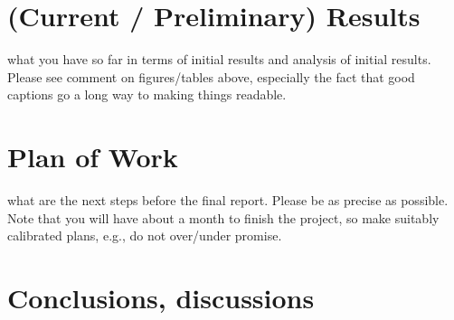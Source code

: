 \documentclass[11pt]{extarticle}
\begin{document}
\section{(Current / Preliminary) Results} 
what you have so far in terms of initial results and analysis of initial results. Please see comment on figures/tables above, especially the fact that good captions go a long way to making things readable.

\section{Plan of Work} 
what are the next steps before the final report. Please be as precise as possible. Note that you will have about a month to finish the project, so make suitably calibrated plans, e.g., do not over/under promise.

\section{Conclusions, discussions}



\end{document}
